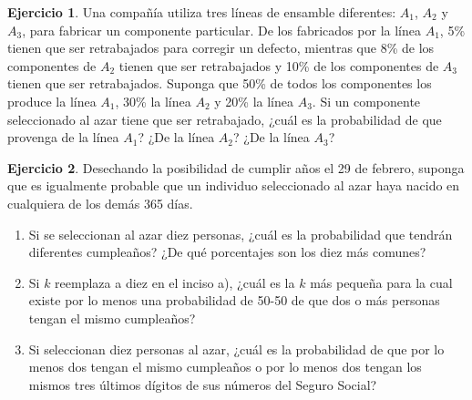 \documentclass[
  11pt,
]{book}
\theoremstyle{definition}
\theoremstyle{definition}
\theoremstyle{definition}
\newtheorem{exercise}{Ejercicio}[chapter]
\theoremstyle{definition}
\theoremstyle{remark}
\begin{document}
\begin{exercise}
Una compañía utiliza tres líneas de ensamble diferentes: \(A_1\), \(A_2\) y \(A_3\), para fabricar un componente particular. De los fabricados por la línea \(A_1\), 5\% tienen que ser retrabajados para corregir un defecto, mientras que 8\% de los componentes de \(A_2\) tienen que ser retrabajados y 10\% de los componentes de \(A_3\) tienen que ser retrabajados. Suponga que 50\% de todos los componentes los produce la línea \(A_1\), 30\% la línea \(A_2\) y 20\% la línea \(A_3\). Si un componente seleccionado al azar tiene que ser retrabajado, ¿cuál es la probabilidad de que provenga de la línea \(A_1\)? ¿De la línea \(A_2\)? ¿De la línea \(A_3\)?
\end{exercise}

\begin{exercise}

Desechando la posibilidad de cumplir años el 29 de febrero, suponga que es igualmente probable que un individuo seleccionado al azar haya nacido en cualquiera de los demás 365 días.

\begin{enumerate}
\def\labelenumi{\alph{enumi}.}
\item
  Si se seleccionan al azar diez personas, ¿cuál es la probabilidad que tendrán diferentes cumpleaños? ¿De qué porcentajes son los diez más comunes?
\item
  Si \(k\) reemplaza a diez en el inciso a), ¿cuál es la \(k\) más pequeña para la cual existe por lo menos una probabilidad de 50-50 de que dos o más personas tengan el mismo cumpleaños?
\item
  Si seleccionan diez personas al azar, ¿cuál es la probabilidad de que por lo menos dos tengan el mismo cumpleaños o por lo menos dos tengan los mismos tres últimos dígitos de sus números del Seguro Social?
\end{enumerate}

\end{exercise}
\end{document}
